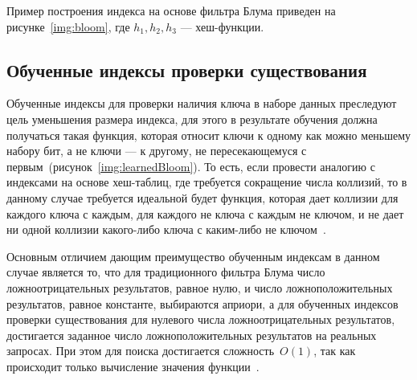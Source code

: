 Пример построения индекса на основе фильтра Блума приведен на
рисунке~\ref{img:bloom}, где $h_1, h_2, h_3$ --- хеш-функции.


\subsection{Обученные индексы проверки существования}

Обученные индексы для проверки наличия ключа в наборе данных преследуют цель
уменьшения размера индекса, для этого в результате обучения должна получаться
такая функция, которая относит ключи к одному как можно меньшему набору бит, а
не ключи --- к другому, не пересекающемуся с
первым~(рисунок~\ref{img:learnedBloom}). То
есть, если провести аналогию с индексами на основе хеш-таблиц, где требуется
сокращение числа коллизий, то в данному случае требуется идеальной будет
функция, которая дает коллизии для каждого ключа с каждым, для каждого не ключа
с каждым не ключом, и не дает ни одной коллизии какого-либо ключа с каким-либо
не ключом~\cite{main}.

Основным отличием дающим преимущество обученным индексам в данном случае
является то, что для традиционного фильтра Блума число ложноотрицательных
результатов, равное нулю, и число ложноположительных результатов, равное
константе, выбираются априори, а для обученных индексов проверки существования
для нулевого числа ложноотрицательных результатов, достигается заданное число
ложноположительных результатов на реальных запросах. При этом для поиска
достигается сложность~$O(1)$, так как происходит только вычисление значения
функции~\cite{main}.


